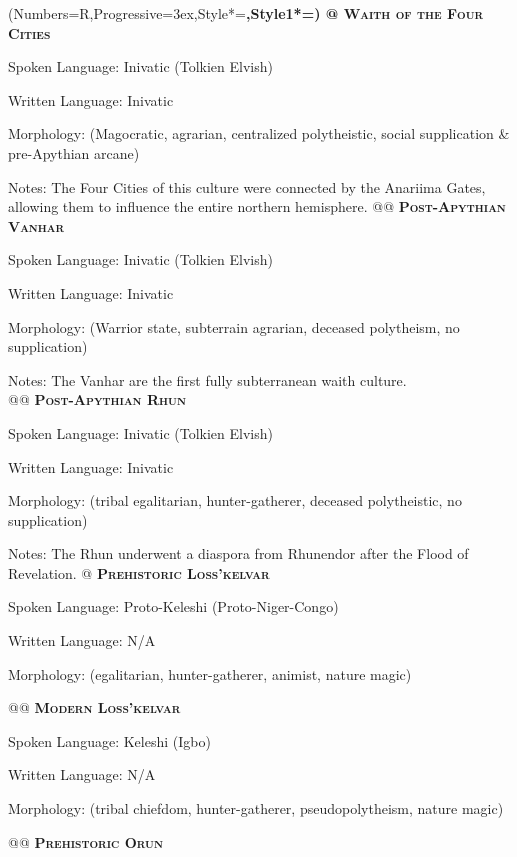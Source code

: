 \documentclass[12pt]{article}
\begin{document}
\begin{easylist}
	\NewList
	\ListProperties(Numbers=R,Progressive=3ex,Style*=\bf,Style1*=\Large\bf)
	@ \textsc{\textbf{ Waith of the Four Cities}}
	
	\normalfont Spoken Language: Inivatic (Tolkien Elvish)
	
	Written Language: Inivatic
	
	Morphology: (Magocratic, agrarian, centralized polytheistic, social supplication \& pre-Apythian arcane)
	
	{\footnotesize Notes: The Four Cities of this culture were connected by the Anariima Gates, allowing them to influence the entire northern hemisphere.}
	@@ \textsc{\textbf{Post-Apythian Vanhar}}
	
	\normalfont Spoken Language: Inivatic (Tolkien Elvish)
	
	Written Language: Inivatic
	
	Morphology: (Warrior state, subterrain agrarian, deceased polytheism, no supplication)
	
	{\footnotesize Notes: The Vanhar are the first fully subterranean waith culture.}
	\\
	@@ \textsc{\textbf{Post-Apythian Rhun}}
	
	\normalfont Spoken Language: Inivatic (Tolkien Elvish)
	
	Written Language: Inivatic
	
	Morphology: (tribal egalitarian, hunter-gatherer, deceased polytheistic, no supplication)
	
	{\footnotesize Notes: The Rhun underwent a diaspora from Rhunendor after the Flood of Revelation.}
	@ \textsc{\textbf{Prehistoric Loss'kelvar}}
	
	\normalfont Spoken Language: Proto-Keleshi (Proto-Niger-Congo)
	
	Written Language: N/A
	
	Morphology: (egalitarian, hunter-gatherer, animist, nature magic)
	
	@@ \textsc{\textbf{Modern Loss'kelvar}}
	
	\normalfont Spoken Language: Keleshi (Igbo)
	
	Written Language: N/A
	
	Morphology: (tribal chiefdom, hunter-gatherer, pseudopolytheism, nature magic)
	
	@@ \textsc{\textbf{Prehistoric Orun}}
	

\end{easylist}
\end{document}
